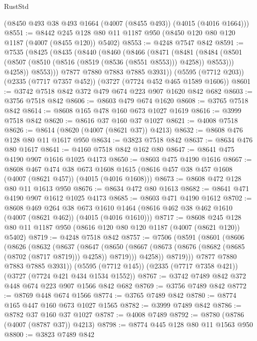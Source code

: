 \begin{lexlean}{RustStd}
\begin{coremodule}
    (@8450 @493 @38 @493 @1664 (@4007 (@8455 @493)) (@4015 (@4016 @1664)))
@8551 := @8442 @245 @128 @80 @11 @1187 @950 (@8450 @120 @80 @120 @1187 (@4007 (@8455 @120)) @5402)
@8553 := @4248 @7547 @842
@8591 := @7535
    (@8425
      (@8435
        (@8440
          (@8460
            (@8466
              (@8471
                (@8481
                  (@8484 (@8501 (@8507 (@8510 (@8516 (@8519 (@8536 (@8551 @8553))) @4258)) @8553)))
                  @4258))
              @8553)))
        @7877
        @7880
        @7883
        @7885
        @3931))
    (@5595 (@7712 @203))
    (@2335 (@7717 @7357 @452))
    (@3727 (@7724 @452 @465 @1589 @1606))
@8601 := @3742 @7518 @842 @372 @479 @674 @223 @907 @1620 @842 @682
@8603 := @3756 @7518 @842
@8606 := @8603 @479 @674 @1620
@8608 := @3765 @7518 @842
@8614 := @8608 @165 @478 @160 @673 @1027 @1619
@8616 := @3999 @7518 @842
@8620 := @8616 @37 @160 @37 @1027
@8621 := @4008 @7518
@8626 := @8614 (@8620 (@4007 (@8621 @37)) @4213)
@8632 := @8608 @476 @128 @80 @11 @1617 @950
@8634 := @3823 @7518 @842
@8637 := @8634 @476 @80 @1617
@8641 := @4160 @7518 @842 @162 @80
@8647 := @8641 @475 @4190 @907 @1616 @1025 @4173
@8650 := @8603 @475 @4190 @1616
@8667 := @8608
    @467
    @474
    @38
    @673
    @1608
    @1615
    (@8616 @457 @38 @457 @1608 (@4007 (@8621 @457)) (@4015 (@4016 @1608)))
@8673 := @8608 @472 @128 @80 @11 @1613 @950
@8676 := @8634 @472 @80 @1613
@8682 := @8641 @471 @4190 @907 @1612 @1025 @4173
@8685 := @8603 @471 @4190 @1612
@8702 := @8608
    @469
    @264
    @38
    @673
    @1610
    @1464
    (@8616 @462 @38 @462 @1610 (@4007 (@8621 @462)) (@4015 (@4016 @1610)))
@8717 := @8608 @245 @128 @80 @11 @1187 @950 (@8616 @120 @80 @120 @1187 (@4007 (@8621 @120)) @5402)
@8719 := @4248 @7518 @842
@8757 := @7506
    (@8591
      (@8601
        (@8606
          (@8626
            (@8632
              (@8637
                (@8647
                  (@8650 (@8667 (@8673 (@8676 (@8682 (@8685 (@8702 (@8717 @8719))) @4258)) @8719)))
                  @4258))
              @8719)))
        @7877
        @7880
        @7883
        @7885
        @3931))
    (@5595 (@7712 @145))
    (@2335 (@7717 @7358 @421))
    (@3727 (@7724 @421 @434 @1534 @1552))
@8767 := @3742 @7489 @842 @372 @448 @674 @223 @907 @1566 @842 @682
@8769 := @3756 @7489 @842
@8772 := @8769 @448 @674 @1566
@8774 := @3765 @7489 @842
@8780 := @8774 @165 @447 @160 @673 @1027 @1565
@8782 := @3999 @7489 @842
@8786 := @8782 @37 @160 @37 @1027
@8787 := @4008 @7489
@8792 := @8780 (@8786 (@4007 (@8787 @37)) @4213)
@8798 := @8774 @445 @128 @80 @11 @1563 @950
@8800 := @3823 @7489 @842

\end{coremodule}
\end{lexlean}
